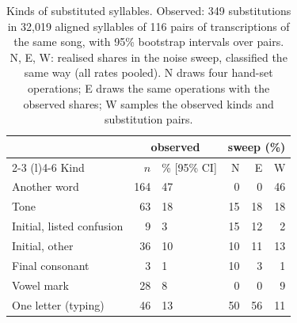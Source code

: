 \begin{table}[t]
\centering\small
\caption{Kinds of substituted syllables. Observed: 349 substitutions in 32,019
aligned syllables of 116 pairs of transcriptions of the same song, with 95\% bootstrap intervals over pairs.
N, E, W: realised shares in the noise sweep, classified the same way (all rates pooled). N draws four hand-set
operations; E draws the same operations with the observed shares; W samples the observed kinds and substitution
pairs.}
\label{tab:channel}
\setlength{\tabcolsep}{4pt}
\begin{tabular}{@{}l r l rrr@{}}
\toprule
 & \multicolumn{2}{c}{observed} & \multicolumn{3}{c}{sweep (\%)} \\
\cmidrule(lr){2-3} \cmidrule(l){4-6}
Kind & $n$ & \% [95\% CI] & N & E & W \\
\midrule
Another word & 164 & 47 & 0 & 0 & 46 \\
Tone & 63 & 18 & 15 & 18 & 18 \\
Initial, listed confusion & 9 & 3 & 15 & 12 & 2 \\
Initial, other & 36 & 10 & 10 & 11 & 13 \\
Final consonant & 3 & 1 & 10 & 3 & 1 \\
Vowel mark & 28 & 8 & 0 & 0 & 9 \\
One letter (typing) & 46 & 13 & 50 & 56 & 11 \\
\bottomrule
\end{tabular}
\end{table}

